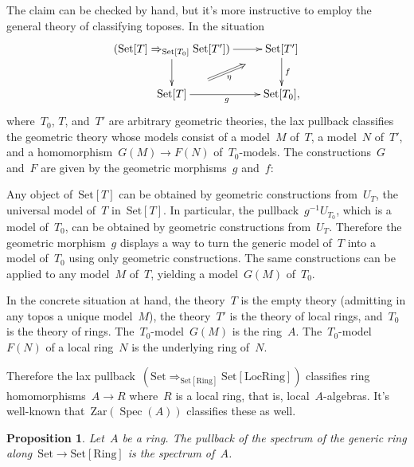 \documentclass[10pt,reqno,a4paper]{amsbook}
\makeatletter
\theoremstyle{definition}
\theoremstyle{plain}
\newtheorem{prop}[defn]{Proposition}
\theoremstyle{remark}
\newcommand{\Set}{\mathrm{Set}}
\newcommand{\Zar}{\mathrm{Zar}}
\newcommand{\Ring}{\mathrm{Ring}}
\newcommand{\LocRing}{\mathrm{LocRing}}
\DeclareMathOperator{\Spec}{Spec}
\newcommand{\?}{\,{:}\,}
\renewcommand{\_}{\mathpunct{.}\,}
\renewenvironment{proof}[1][\proofname]{\par
  \pushQED{\qed}%
  \normalfont \topsep6\p@\@plus6\p@\relax
  \trivlist
  \item[\hskip\labelsep
        \itshape
    #1\@addpunct{.}]\ignorespaces
}{%
  \popQED\endtrivlist\@endpefalse
}
\makeatother
\begin{document}
\begin{proof}The claim can be checked by hand, but it's more instructive to
employ the general theory of classifying toposes. In the situation
\[ \xymatrix{
  (\Set[T] \Rightarrow_{\Set[T_0]} \Set[T']) \ar[r] \ar[d] & \Set[T'] \ar[d]^f \\
  \Set[T] \ar[r]_g \ar@{}[ur]^(.3){}="a"^(.7){}="b" \ar@{=>}_\eta "a";"b" & \Set[T_0],
} \]
where~$T_0$, $T$, and~$T'$ are arbitrary geometric theories, the lax pullback
classifies the geometric theory whose models consist of a model~$M$ of~$T$, a
model~$N$ of~$T'$, and a homomorphism~$G(M) \to F(N)$ of~$T_0$-models. The
constructions~$G$ and~$F$ are given by the geometric morphisms~$g$ and~$f$:

Any object of~$\Set[T]$ can be obtained by geometric constructions from~$U_T$,
the universal model of~$T$ in~$\Set[T]$. In particular, the pullback~$g^{-1}
U_{T_0}$, which is a model of~$T_0$, can be obtained by geometric constructions
from~$U_T$. Therefore the geometric morphism~$g$ displays a way to turn the
generic model of~$T$ into a model of~$T_0$ using only geometric constructions.
The same constructions can be applied to any model~$M$ of~$T$, yielding a
model~$G(M)$ of~$T_0$.

In the concrete situation at hand, the theory~$T$ is the empty theory
(admitting in any topos a unique model~$M$), the theory~$T'$ is the theory of local
rings, and~$T_0$ is the theory of rings. The~$T_0$-model~$G(M)$ is the
ring~$A$. The~$T_0$-model~$F(N)$ of a local ring~$N$ is the underlying ring
of~$N$.

Therefore the lax pullback~$(\Set \Rightarrow_{\Set[\Ring]} \Set[\LocRing])$
classifies ring homomorphisms~$A \to R$ where~$R$ is a local ring, that is,
local~$A$-algebras. It's well-known that~$\Zar(\Spec(A))$ classifies these as
well.
\end{proof}

\begin{prop}\label{prop:spectrum-as-pullback}
Let~$A$ be a ring. The pullback of the spectrum of the generic ring
along~$\Set \to \Set[\Ring]$ is the spectrum of~$A$.
\end{prop}
\end{document}
